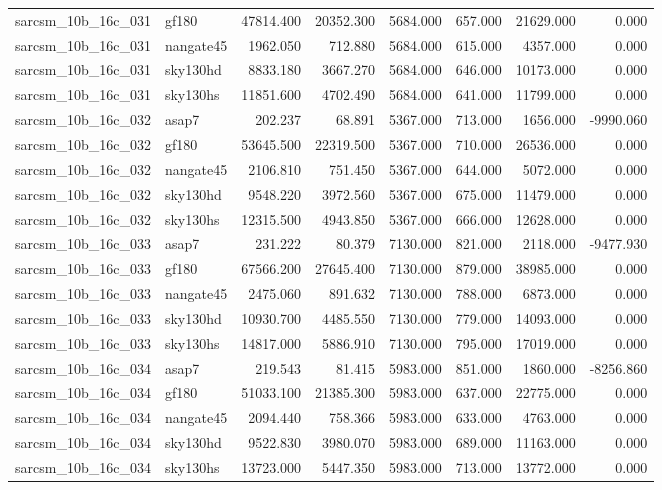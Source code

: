 \begin{tabular}{llrrrrrr}
sarcsm\_10b\_16c\_031 & gf180 & 47814.400 & 20352.300 & 5684.000 & 657.000 & 21629.000 & 0.000 \\
sarcsm\_10b\_16c\_031 & nangate45 & 1962.050 & 712.880 & 5684.000 & 615.000 & 4357.000 & 0.000 \\
sarcsm\_10b\_16c\_031 & sky130hd & 8833.180 & 3667.270 & 5684.000 & 646.000 & 10173.000 & 0.000 \\
sarcsm\_10b\_16c\_031 & sky130hs & 11851.600 & 4702.490 & 5684.000 & 641.000 & 11799.000 & 0.000 \\
sarcsm\_10b\_16c\_032 & asap7 & 202.237 & 68.891 & 5367.000 & 713.000 & 1656.000 & -9990.060 \\
sarcsm\_10b\_16c\_032 & gf180 & 53645.500 & 22319.500 & 5367.000 & 710.000 & 26536.000 & 0.000 \\
sarcsm\_10b\_16c\_032 & nangate45 & 2106.810 & 751.450 & 5367.000 & 644.000 & 5072.000 & 0.000 \\
sarcsm\_10b\_16c\_032 & sky130hd & 9548.220 & 3972.560 & 5367.000 & 675.000 & 11479.000 & 0.000 \\
sarcsm\_10b\_16c\_032 & sky130hs & 12315.500 & 4943.850 & 5367.000 & 666.000 & 12628.000 & 0.000 \\
sarcsm\_10b\_16c\_033 & asap7 & 231.222 & 80.379 & 7130.000 & 821.000 & 2118.000 & -9477.930 \\
sarcsm\_10b\_16c\_033 & gf180 & 67566.200 & 27645.400 & 7130.000 & 879.000 & 38985.000 & 0.000 \\
sarcsm\_10b\_16c\_033 & nangate45 & 2475.060 & 891.632 & 7130.000 & 788.000 & 6873.000 & 0.000 \\
sarcsm\_10b\_16c\_033 & sky130hd & 10930.700 & 4485.550 & 7130.000 & 779.000 & 14093.000 & 0.000 \\
sarcsm\_10b\_16c\_033 & sky130hs & 14817.000 & 5886.910 & 7130.000 & 795.000 & 17019.000 & 0.000 \\
sarcsm\_10b\_16c\_034 & asap7 & 219.543 & 81.415 & 5983.000 & 851.000 & 1860.000 & -8256.860 \\
sarcsm\_10b\_16c\_034 & gf180 & 51033.100 & 21385.300 & 5983.000 & 637.000 & 22775.000 & 0.000 \\
sarcsm\_10b\_16c\_034 & nangate45 & 2094.440 & 758.366 & 5983.000 & 633.000 & 4763.000 & 0.000 \\
sarcsm\_10b\_16c\_034 & sky130hd & 9522.830 & 3980.070 & 5983.000 & 689.000 & 11163.000 & 0.000 \\
sarcsm\_10b\_16c\_034 & sky130hs & 13723.000 & 5447.350 & 5983.000 & 713.000 & 13772.000 & 0.000 \\

\end{tabular}
